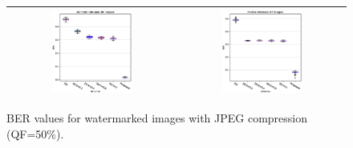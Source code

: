 \documentclass[runningheads]{llncs}
\begin{document}
\begin{figure}[H]
	\begin{center}
		\begin{tabular}{|c|c|}\hline
			\includegraphics[width=0.5\textwidth]{BER50SaintGall.eps}
			&\includegraphics[width=0.5\textwidth]{BER50Parzival.eps}\\\hline
		\end{tabular}
	\end{center}
	\caption{BER values for watermarked images with JPEG compression (QF=50\%).}
	\label{ber50}
\end{figure}
\end{document}
